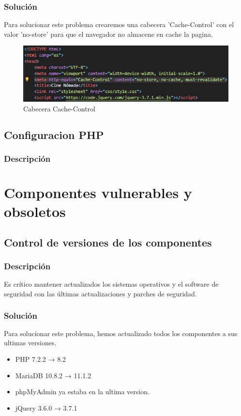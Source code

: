 \documentclass{report}
\begin{document}
                \subsubsection{Solución}
                    Para solucionar este problema crearemos una cabecera 'Cache-Control' con el valor 'no-store' para que el navegador no almacene en cache la pagina.
                    \begin{figure}[H]
                        \centering
                        \includegraphics[width=\textwidth]{./img/vulnerabilidades/3.5.9.1.png}
                        \caption{Cabecera Cache-Control}
                    \end{figure}
            \subsection{Configuracion PHP}
                \subsubsection{Descripción}
            \clearpage
        \section{Componentes vulnerables y obsoletos}
            \subsection{Control de versiones de los componentes}
                \subsubsection{Descripción}
                    Es crítico mantener actualizados los sistemas operativos y el software de seguridad con las últimas actualizaciones y parches de seguridad.
                \subsubsection{Solución}
                    Para solucionar este problema, hemos actualizado todos los componentes a sus ultimas versiones.
                    \begin{itemize}
                        \item PHP 7.2.2 → 8.2
                        \item MariaDB 10.8.2 → 11.1.2
                        \item phpMyAdmin ya estaba en la ultima version.
                        \item jQuery 3.6.0 → 3.7.1
                    \end{itemize}
            \clearpage
\end{document}
